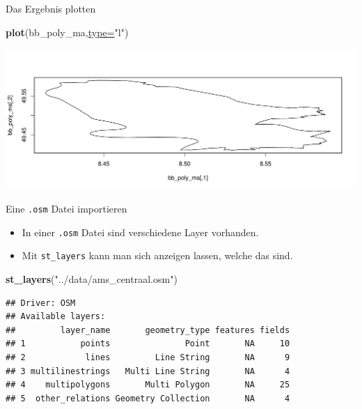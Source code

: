 \documentclass[ignorenonframetext,]{beamer}
\newenvironment{Shaded}{\begin{snugshade}}{\end{snugshade}}
\newcommand{\DataTypeTok}[1]{\textcolor[rgb]{0.74,0.68,0.62}{\underline{#1}}}
\newcommand{\KeywordTok}[1]{\textcolor[rgb]{0.26,0.66,0.93}{\textbf{#1}}}
\newcommand{\NormalTok}[1]{\textcolor[rgb]{0.74,0.68,0.62}{#1}}
\newcommand{\StringTok}[1]{\textcolor[rgb]{0.02,0.61,0.04}{#1}}
\providecommand{\tightlist}{%
  \setlength{\itemsep}{0pt}\setlength{\parskip}{0pt}}
\begin{document}
\begin{frame}[fragile]{Das Ergebnis plotten}
\protect\hypertarget{das-ergebnis-plotten}{}

\begin{Shaded}
\begin{Highlighting}[]
\KeywordTok{plot}\NormalTok{(bb_poly_ma,}\DataTypeTok{type=}\StringTok{"l"}\NormalTok{)}
\end{Highlighting}
\end{Shaded}

\includegraphics{B7_simplefeatures_files/figure-beamer/unnamed-chunk-16-1.pdf}

\end{frame}

\begin{frame}[fragile]{Eine \texttt{.osm} Datei importieren}
\protect\hypertarget{eine-.osm-datei-importieren}{}

\begin{itemize}
\tightlist
\item
  In einer \texttt{.osm} Datei sind verschiedene Layer vorhanden.
\item
  Mit \texttt{st\_layers} kann man sich anzeigen lassen, welche das
  sind.
\end{itemize}

\begin{Shaded}
\begin{Highlighting}[]
\KeywordTok{st_layers}\NormalTok{(}\StringTok{"../data/ams_centraal.osm"}\NormalTok{)}
\end{Highlighting}
\end{Shaded}

\begin{verbatim}
## Driver: OSM 
## Available layers:
##         layer_name       geometry_type features fields
## 1           points               Point       NA     10
## 2            lines         Line String       NA      9
## 3 multilinestrings   Multi Line String       NA      4
## 4    multipolygons       Multi Polygon       NA     25
## 5  other_relations Geometry Collection       NA      4
\end{verbatim}

\end{frame}
\end{document}
